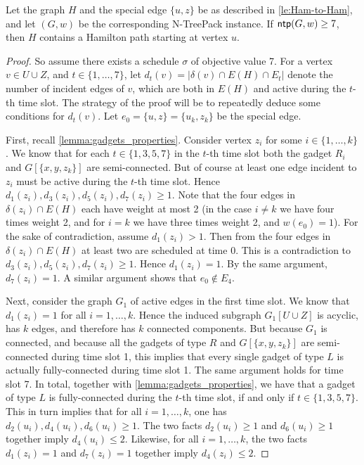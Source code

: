 \documentclass[runningheads]{llncs}
\newcommand{\set}[1]{\{ #1 \}}
\newcommand{\fromto}[2]{\set{#1, \ldots, #2}}
\newcommand{\xxxNTP}{{\sc N-TreePack}}
\DeclareMathOperator{\ntp}{\text{\sf ntp}}
\begin{document}
\begin{lemma}
\label{lemma:lasse-only-if}
Let the graph $H$ and the special edge $\set{u,z}$ be as described in \cref{le:Ham-to-Ham}, and let $(G, w)$ be the corresponding {\xxxNTP} instance. If $\ntp(G, w) \geq 7$, then $H$ contains a Hamilton path starting at vertex $u$.
\end{lemma}
\begin{proof}
So assume there exists a schedule $\sigma$ of objective value 7. 
For a vertex $v \in U \cup Z$, and $t \in \fromto{1}{7}$, let $d_t(v) = |\delta(v) \cap E(H) \cap E_t|$ denote the number of incident edges of $v$, which are both in $E(H)$ and active during the $t$-th time slot. The strategy of the proof will be to repeatedly deduce some conditions for $d_t(v)$. 
Let $e_0 = \set{u, z} = \set{u_k, z_k}$ be the special edge.

First, recall \cref{lemma:gadgets_properties}. Consider vertex $z_i$ for some $i \in \fromto{1}{k}$. We know that for each $t \in \set{1, 3, 5, 7}$ in the $t$-th time slot both the gadget $R_i$ and $G[\set{x,y,z_k}]$ are semi-connected. But of course at least one edge incident to $z_i$ must be active during the $t$-th time slot. Hence $d_1(z_i), d_3(z_i), d_5(z_i), d_7(z_i) \geq 1$.  Note that the four edges in $\delta(z_i) \cap E(H)$ each have weight at most 2 (in the case $i \neq k$ we have four times weight 2, and for $i = k$ we have three times weight 2, and $w(e_0) = 1$). For the sake of contradiction, assume $d_1(z_i) > 1$. Then from the four edges in $\delta(z_i) \cap E(H)$ at least two are scheduled at time $0$. This is a contradiction to  $d_3(z_i), d_5(z_i), d_7(z_i) \geq 1$. Hence $d_1(z_i) = 1$. By the same argument, $d_7(z_i) = 1$. A similar argument shows that $e_0 \not\in E_4$.

Next, consider the graph $G_1$ of active edges in the first time slot. We know that  $d_1(z_i) = 1$ for all $i= 1,\dots, k$. Hence the induced subgraph $G_1[U \cup Z]$ is acyclic, has $k$ edges, and therefore has $k$ connected components. But because $G_1$ is connected, and because all the gadgets of type $R$ and $G[\set{x, y, z_k}]$ are semi-connected during time slot 1, this implies that every single gadget of type $L$ is actually fully-connected during time slot 1. The same argument holds for time slot 7. In total, together with \cref{lemma:gadgets_properties}, we have that a gadget of type $L$ is fully-connected during the $t$-th time slot, if and only if $t \in \set{1, 3, 5, 7}$. This in turn implies that for all $i = 1,\dots, k$, one has $d_2(u_i), d_4(u_i), d_6(u_i) \geq 1$. The two facts $d_2(u_i) \geq 1$ and $d_6(u_i) \geq 1$ together imply $d_4(u_i) \leq 2$. Likewise, for all $i = 1,\dots,k$, the two facts $d_1(z_i) = 1$ and $d_7(z_i) = 1$ together imply $d_4(z_i) \leq 2$.


\end{proof}
\end{document}
